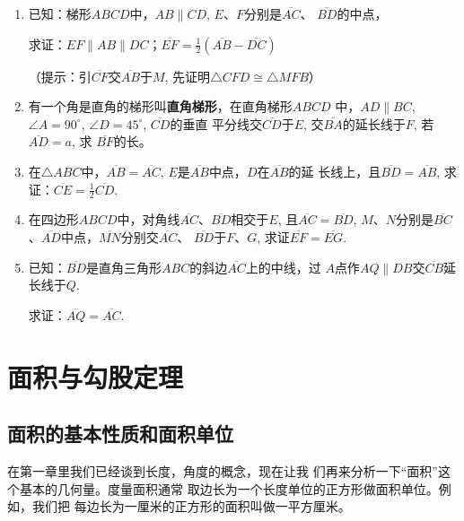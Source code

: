 \begin{enumerate}
\item 已知：梯形$ABCD$中，$AB\parallel CD$, $E$、$F$分别是$\overline{AC}$、
$\overline{BD}$的中点，

求证：$EF\parallel AB\parallel DC$；$\overline{EF}=\frac{1}{2}(\overline{AB}-\overline{DC})$

（提示：引$\overline{CF}$交$\overline{AB}$于$M$, 先证明$\triangle CFD\cong \triangle MFB$）
\item 有一个角是直角的梯形叫\textbf{直角梯形}，在直角梯形$ABCD$
中，$AD\parallel BC$, $\angle A=90^{\circ}$, $\angle D=45^{\circ}$, $\overline{CD}$的垂直
平分线交$\overline{CD}$于$E$, 交$\overline{BA}$的延长线于$F$, 若$\overline{AD}=a$, 求
$\overline{BF}$的长。
\item 在$\triangle ABC$中，$\overline{AB}=\overline{AC}$, $E$是$\overline{AB}$中点，$D$在$\overline{AB}$的延
长线上，且$\overline{BD}=\overline{AB}$, 求证：$\overline{CE}=\frac{1}{2}\overline{CD}$.
\item 在四边形$ABCD$中，对角线$\overline{AC}$、$\overline{BD}$相交于$E$, 且$\overline{AC}=\overline{BD}$, $M$、$N$分别是$\overline{BC}$、$\overline{AD}$中点，$\overline{MN}$分别交$\overline{AC}$、
$\overline{BD}$于$F$、$G$, 求证$\overline{EF}=\overline{EG}$.
\item 已知：$\overline{BD}$是直角三角形$ABC$的斜边$\overline{AC}$上的中线，过
$A$点作$AQ\parallel DB$交$\overline{CB}$延长线于$Q$.

求证：$\overline{AQ}=\overline{AC}$.

\end{enumerate}


\section{面积与勾股定理}


\subsection{面积的基本性质和面积单位}
在第一章里我们已经谈到长度，角度的概念，现在让我
们再来分析一下“面积”这个基本的几何量。度量面积通常
取边长为一个长度单位的正方形做面积单位。例如，我们把
每边长为一厘米的正方形的面积叫做一平方厘米。

\begin{figure}[htp]
    \centering
{}
    \caption{}
\end{figure}


